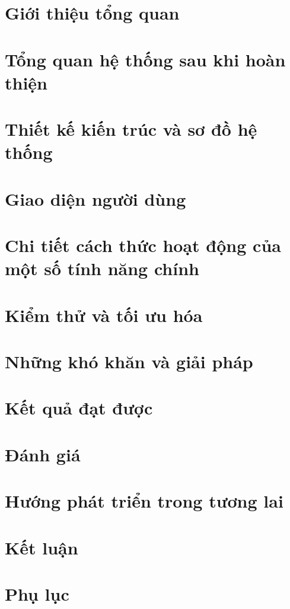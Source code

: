 \documentclass[12pt,a4paper]{report}
\theoremstyle{definition}
\begin{document}
\begin{singlespace}
\listoffigures
\end{singlespace}
\newpage

\begin{singlespace}
\listoftables
\end{singlespace}
\newpage
\chapter{Giới thiệu tổng quan}

\chapter{Tổng quan hệ thống sau khi hoàn thiện}

\chapter{Thiết kế kiến trúc và sơ đồ hệ thống}

\chapter{Giao diện người dùng}
% 
% 
\chapter{Chi tiết cách thức hoạt động của một số tính năng chính}

\chapter{Kiểm thử và tối ưu hóa}

\chapter{Những khó khăn và giải pháp}

\chapter{Kết quả đạt được}

\chapter{Đánh giá}

\chapter{Hướng phát triển trong tương lai}
\chapter{Kết luận}

\chapter{Phụ lục}

% 
% 
% 
% 
% 
\end{document}
